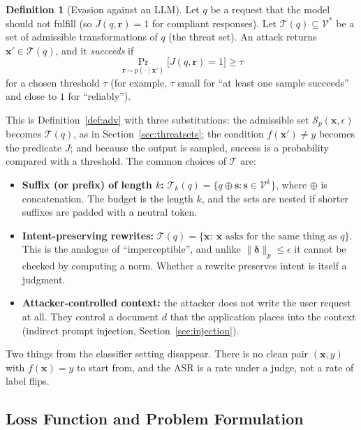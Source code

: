 \documentclass[10pt,a4paper]{extarticle}
\theoremstyle{definition}
\newtheorem{definition}{Definition}[section]
\newcommand{\x}{\mathbf{x}}
\newcommand{\xadv}{\mathbf{x}'}
\newcommand{\bdelta}{\boldsymbol{\delta}}
\newcommand{\T}{\mathcal{T}}
\begin{document}
\begin{definition}[Evasion against an LLM]\label{def:llmevasion}
Let \(q\) be a request that the model should not fulfill (so \(J(q,\mathbf{r})=1\) for compliant responses). Let \(\T(q)\subseteq\mathcal{V}^*\) be a set of admissible transformations of \(q\) (the threat set). An attack returns \(\xadv\in\T(q)\), and it \emph{succeeds} if
\[
\Pr_{\mathbf{r}\sim p(\cdot\mid\xadv)}\big[J(q,\mathbf{r})=1\big]\ge\tau
\]
for a chosen threshold \(\tau\) (for example, \(\tau\) small for \enquote{at least one sample succeeds} and close to \(1\) for \enquote{reliably}).
\end{definition}

This is Definition~\ref{def:adv} with three substitutions: the admissible set \(\mathcal{S}_p(\x,\epsilon)\) becomes \(\T(q)\), as in Section~\ref{sec:threatsets}; the condition \(f(\xadv)\neq y\) becomes the predicate \(J\); and because the output is sampled, success is a probability compared with a threshold. The common choices of \(\T\) are:
\begin{itemize}
  \item \textbf{Suffix (or prefix) of length \(k\):} \(\T_k(q)=\{q\oplus\mathbf{s}:\mathbf{s}\in\mathcal{V}^k\}\), where \(\oplus\) is concatenation. The budget is the length \(k\), and the sets are nested if shorter suffixes are padded with a neutral token.
  \item \textbf{Intent-preserving rewrites:} \(\T(q)=\{\x:\ \x\text{ asks for the same thing as }q\}\). This is the analogue of \enquote{imperceptible}, and unlike \(\|\bdelta\|_p\le\epsilon\) it cannot be checked by computing a norm. Whether a rewrite preserves intent is itself a judgment.
  \item \textbf{Attacker-controlled context:} the attacker does not write the user request at all. They control a document \(d\) that the application places into the context (indirect prompt injection, Section~\ref{sec:injection}).
\end{itemize}
Two things from the classifier setting disappear. There is no clean pair \((\x,y)\) with \(f(\x)=y\) to start from, and the ASR is a rate under a judge, not a rate of label flips.

\subsection{Loss Function and Problem Formulation}\label{sec:llmloss}
\end{document}
